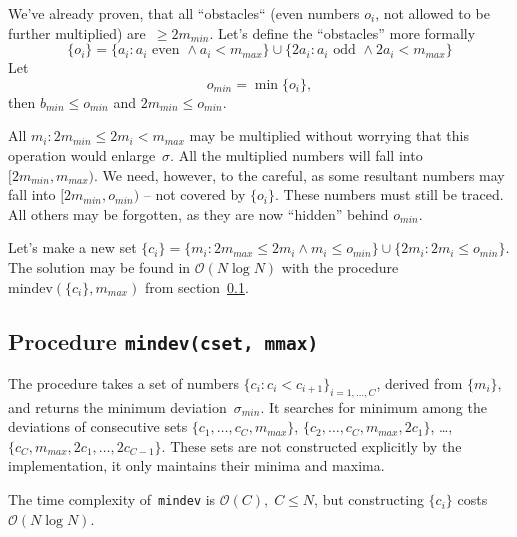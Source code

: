 \documentclass[paper=a4,parskip=half,DIV=12]{leetcode}
\begin{document}
We've already proven, that all ``obstacles`` (even numbers $o_i$, not allowed
to be further multiplied) are~$\ge 2 m_{min}$. Let's define the ``obstacles''
more formally
\begin{equation}
  \{ o_i \} = \{ a_i: a_i \text{ even } \wedge a_i < m_{max} \} \cup
              \{ 2 a_i: a_i \text{ odd } \wedge  2 a_i < m_{max} \}
  \label{eq:SDKKJ}
\end{equation}
Let
\begin{equation}
  o_{min} = \min \{o_i\},
  \label{eq:T13ET}
\end{equation}
then $b_{min} \le o_{min}$ and $2 m_{min} \le o_{min}$.

All $m_i: 2 m_{min} \le 2 m_i < m_{max}$ may be multiplied without worrying
that this operation would enlarge~$\sigma$. All the multiplied numbers will
fall into $[2 m_{min}, m_{max})$. We need, however, to the careful, as some
resultant numbers may fall into $[2 m_{min}, o_{min})$ -- not covered by
$\{o_i\}$. These numbers must still be traced. All others may be forgotten,
as they are now ``hidden'' behind $o_{min}$.

Let's make a new set $\{ c_i \} = \{ m_i: 2 m_{max} \le 2 m_i \wedge m_i \le o_{min} \}
\cup \{ 2 m_i: 2 m_i \le o_{min} \}$. The solution may be found in
$\mathcal{O}(N \log N)$ with the procedure $\mathrm{mindev}(\{ c_i \}, m_{max})$
from section~\ref{sec:WTM0T}.

\subsection{Procedure \texttt{mindev(cset, mmax)}}
\label{sec:WTM0T}

The procedure takes a set of numbers $\{ c_i: c_i < c_{i+1} \}_{i=1,\dots,C}$,
derived from $\{ m_i \}$, and returns the minimum deviation~$\sigma_{min}$. It
searches for minimum among the deviations of consecutive sets
$\{ c_1, \dots, c_C, m_{max} \}$, $\{ c_2, \dots, c_C, m_{max}, 2 c_1\}$,
\dots, $\{ c_C, m_{max}, 2 c_1, \dots, 2 c_{C-1} \}$. These sets are not
constructed explicitly by the implementation, it only maintains their minima
and maxima.

The time complexity of~\texttt{mindev} is $\mathcal{O}(C),\; C \le N$, but
constructing $\{ c_i \}$ costs $\mathcal{O}(N \log N)$.



\end{document}
